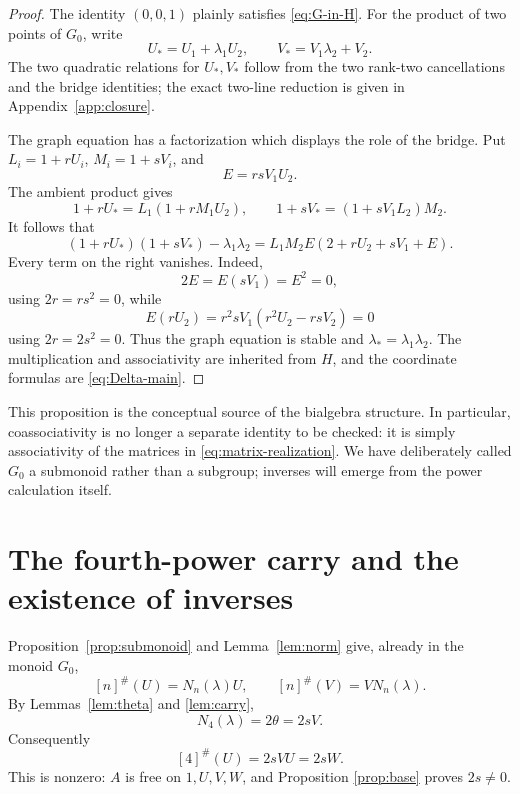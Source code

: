 \documentclass[11pt]{amsart}
\theoremstyle{definition}
\theoremstyle{remark}
\begin{document}
\begin{proof}
The identity \((0,0,1)\) plainly satisfies \eqref{eq:G-in-H}.  For the
product of two points of \(G_0\), write
\begin{equation}\label{eq:product-coordinates}
 U_*=U_1+\lambda_1U_2,
 \qquad
 V_*=V_1\lambda_2+V_2.
\end{equation}
The two quadratic relations for \(U_*,V_*\) follow from the two rank-two
cancellations and the bridge identities; the exact two-line reduction is
given in Appendix~\ref{app:closure}.

The graph equation has a factorization which displays the role of the
bridge.  Put \(L_i=1+rU_i\), \(M_i=1+sV_i\), and
\[
 E=rsV_1U_2.
\]
The ambient product gives
\[
 1+rU_*=L_1(1+rM_1U_2),
 \qquad
 1+sV_*=(1+sV_1L_2)M_2.
\]
It follows that
\begin{equation}\label{eq:graph-factor}
 (1+rU_*)(1+sV_*)-\lambda_1\lambda_2
 =L_1M_2E(2+rU_2+sV_1+E).
\end{equation}
Every term on the right vanishes.  Indeed,
\[
 2E=E(sV_1)=E^2=0,
\]
using \(2r=rs^2=0\), while
\[
 E(rU_2)
 =r^2sV_1(r^2U_2-rsV_2)=0
\]
using \(2r=2s^2=0\).  Thus the graph equation is stable and
\(\lambda_*=\lambda_1\lambda_2\).  The multiplication and associativity
are inherited from \(H\), and the coordinate formulas are
\eqref{eq:Delta-main}.
\end{proof}

This proposition is the conceptual source of the bialgebra structure.  In
particular, coassociativity is no longer a separate identity to be checked:
it is simply associativity of the matrices in
\eqref{eq:matrix-realization}.  We have deliberately called \(G_0\) a
submonoid rather than a subgroup; inverses will emerge from the power
calculation itself.

\section{The fourth-power carry and the existence of inverses}
\label{sec:powers}

Proposition~\ref{prop:submonoid} and Lemma~\ref{lem:norm} give, already in
the monoid \(G_0\),
\begin{equation}\label{eq:norm-both}
 [n]^\#(U)=N_n(\lambda)U,
 \qquad
 [n]^\#(V)=VN_n(\lambda).
\end{equation}
By Lemmas~\ref{lem:theta} and \ref{lem:carry},
\begin{equation}\label{eq:N4-lambda}
 N_4(\lambda)=2\theta=2sV.
\end{equation}
Consequently
\begin{equation}\label{eq:fourth-U}
 [4]^\#(U)=2sVU=2sW.
\end{equation}
This is nonzero: \(A\) is free on \(1,U,V,W\), and Proposition
\ref{prop:base} proves \(2s\ne0\).
\end{document}
